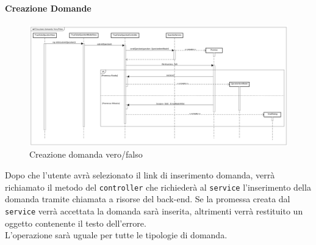 \paragraph{Creazione Domande}

\label{Creazione domanda vero/falso}

\begin{figure}[ht]
	\centering
	\includegraphics[scale=0.25,keepaspectratio]{UML/DiagrammiDiSequenza/Front-end/TrueFalseQuestionCreation.png}
	\caption{Creazione domanda vero/falso}
\end{figure} \FloatBarrier

Dopo che l'utente avrà selezionato il link di inserimento domanda, verrà richiamato il metodo del \texttt{controller} che richiederà al \texttt{service} l'inserimento della domanda tramite chiamata a risorse del back-end. Se la promessa creata dal \texttt{service} verrà accettata la domanda sarà inserita, altrimenti verrà restituito un oggetto contenente il testo dell'errore. \\ L'operazione sarà uguale per tutte le tipologie di domanda. 